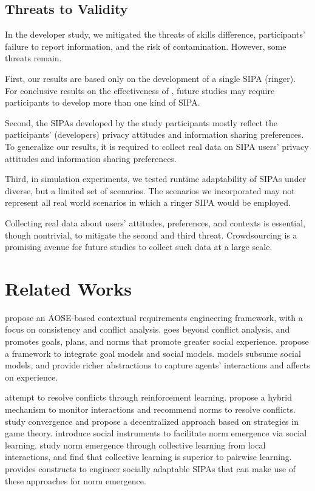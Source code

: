 \subsection{Threats to Validity}
\label{sec:threats-to-validity}

In the developer study, we mitigated the threats of skills difference,
participants' failure to report information, and the risk of
contamination. However, some threats remain.

First, our results are based only on the development of a single SIPA
(ringer). For conclusive results on the effectiveness of \frameworkA,
future studies may require participants to develop more than one kind of
SIPA.

Second, the SIPAs developed by the study participants mostly reflect the
participants' (developers) privacy attitudes and information sharing
preferences. To generalize our results, it is required to collect real
data on SIPA users' privacy attitudes and information sharing
preferences.

Third, in simulation experiments, we tested runtime adaptability of
SIPAs under diverse, but a limited set of scenarios. The scenarios we
incorporated may not represent all real world scenarios in which a
ringer SIPA would be employed.

Collecting real data about users' attitudes, preferences, and contexts
is essential, though nontrivial, to mitigate the second and third
threat. Crowdsourcing is a promising avenue for future studies to
collect such data at a large scale.

\section{Related Works}
\label{sec:arnor-related}

\citet{Ali-2013-Reasoning} propose an AOSE-based contextual 
requirements engineering framework, with a focus on consistency and
conflict analysis.  \frameworkA goes beyond conflict analysis, and 
promotes goals, plans, and norms that promote greater social experience. 
\citet{Rahwan-2006-Integrating} propose a framework
to integrate goal models and social models. \frameworkA models subsume
social models, and provide richer abstractions to capture agents'
interactions and affects on experience. 

\citet{Sugawara-IJCAI11-Emergence} attempt to resolve
conflicts through reinforcement learning. \citet{Mashayekhi-IJCAI16-Silk} propose a hybrid mechanism to monitor
interactions and recommend norms to resolve conflicts. 
\citet{Mihaylov-2014-Decentralized} study convergence and propose a
decentralized approach based on strategies in game theory. 
\citet{Villatoro-TAAS13-Robust} introduce social instruments to
facilitate norm emergence via social learning. 
\citet{Yu-AAMAS13-Emergence} study norm emergence through collective
learning from local interactions, and find that collective learning is
superior to pairwise learning. \frameworkA provides constructs to
engineer socially adaptable SIPAs that can make use of these approaches
for norm emergence.

